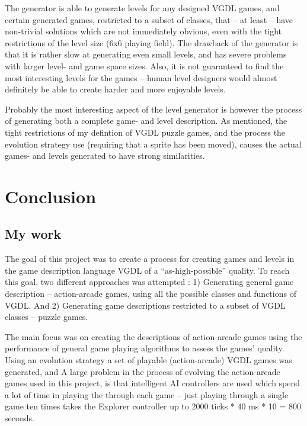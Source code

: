\documentclass[a4paper,titlepage,final]{report}
\begin{document}
The generator is able to generate levels for any designed VGDL games, and certain generated games, restricted to a subset of classes, that -- at least -- have non-trivial solutions which are not immediately obvious, even with the tight restrictions of the level size (6x6 playing field).
The drawback of the generator is that it is rather slow at generating even small levels, and has severe problems with larger level- and game space sizes.
Also, it is not guaranteed to find the most interesting levels for the games -- human level designers would almost definitely be able to create harder and more enjoyable levels.

Probably the most interesting aspect of the level generator is however the process of generating both a complete game- and level description.
As mentioned, the tight restrictions of my defintion of VGDL puzzle games, and the process the evolution strategy use (requiring that a sprite has been moved), causes the actual games- and levels generated to have strong similarities.










\chapter{Conclusion}


\section{My work}
The goal of this project was to create a process for creating games and levels in the game description language VGDL of a ``as-high-possible'' quality.
To reach this goal, two different approaches was attempted : 
1) Generating general game description -- action-arcade games, using all the possible classes and functions of VGDL.
And 2) Generating game descriptions restricted to a subset of VGDL classes -- puzzle games.

The main focus was on creating the descriptions of action-arcade games using the performance of general game playing algorithms to assess the games' quality.
Using an evolution strategy a set of playable (action-arcade) VGDL games was generated, and
A large problem in the process of evolving the action-arcade games used in this project, is that intelligent AI controllers are used which spend a lot of time in playing the through each game -- just playing through a single game ten times takes the Explorer controller up to 2000 ticks * 40 ms * 10 = 800 seconds.
\end{document}
